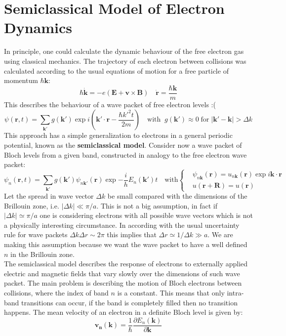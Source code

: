 \documentclass[10.75pt,a4paper,openright,bottom=2cm]{article}
\renewcommand{\Vec}[1]{\boldsymbol{#1}}
\begin{document}
\section{Semiclassical Model of Electron Dynamics}
In principle, one could calculate the dynamic behaviour of the free electron gas using classical mechanics. The trajectory of each electron between collisions was calculated according to the usual equations of motion for a free particle of momentum $\hbar\Vec{k}$:
\[
\hbar\Vec{\Dot{k}}=-e(\Vec{E}+\Vec{v}\times\Vec{B}) \quad \Vec{\Dot{r}}=\frac{\hbar\Vec{k}}{m}
\]
This describes the behaviour of a wave packet of free electron levels :(
\[
\psi(\Vec{r},t)=\sum_{\Vec{k'}}g(\Vec{k'})\exp{i\left(\Vec{k'}\cdot\Vec{r}-\frac{\hbar k'^2t}{2m}\right)} \quad \text{with}\;\;g(\Vec{k'})\approx0\;\text{for}\;|\Vec{k'}-\Vec{k}|>\Delta k
\]
This approach has a simple generalization to electrons in a general periodic potential, known as the \textbf{semiclassical model}. Consider now a wave packet of Bloch levels from a given band, constructed in analogy to the free electron wave packet:
\[
\psi_n(\Vec{r},t)=\sum_{\Vec{k'}}g(\Vec{k'})\psi_{n\Vec{k'}}(\Vec{r})\exp{-\frac{i}{h}E_n(\Vec{k'})t} \quad \text{with}
\left\{
\begin{aligned}
&\psi_{n\Vec{k}}(\Vec{r})=u_{n\Vec{k}}(\Vec{r})\exp{i\Vec{k}\cdot\Vec{r}}\\
&u(\Vec{r}+\Vec{R})=u(\Vec{r})
\end{aligned}
\right.
\]
Let the spread in wave vector $\Delta k$ be small compared with the dimensions of the Brillouin zone, i.e. $|\Delta k|\ll\pi/a$. This is not a big assumption, in fact if $|\Delta k|\simeq\pi/a$ one is considering electrons with all possible wave vectors which is not a physically interesting circumstance. In according with the usual uncertainty rule for wave packets $\Delta k\Delta r\sim2\pi$ this implies that $\Delta r\simeq1/\Delta k\gg a$. We are making this assumption because we want the wave packet to have a well defined $n$ in the  Brillouin zone.\\
The semiclassical model describes the response of electrons to externally applied electric and magnetic fields that vary slowly over the dimensions of such wave packet. The main problem is describing the motion of Bloch electrons between collisions, where the index of band $n$ is a constant. This means that only intra-band transitions can occur, if the band is completely filled then no transition happens. The mean velocity of an electron in a definite Bloch level is given by:
\[
\Vec{v_n}(\Vec{k})=\frac{1}{\hbar}\frac{\partial E_n(\Vec{k})}{\partial\Vec{k}}
\]
\end{document}
